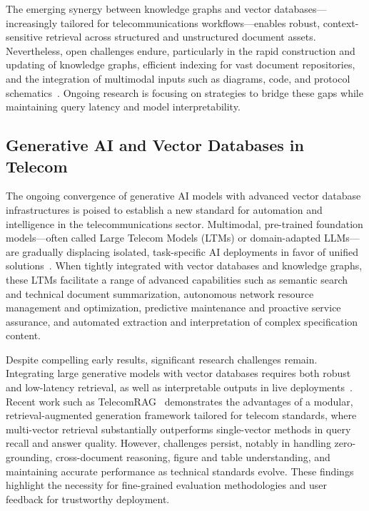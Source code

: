 \documentclass[sigconf]{acmart}
\begin{document}
The emerging synergy between knowledge graphs and vector databases---increasingly tailored for telecommunications workflows---enables robust, context-sensitive retrieval across structured and unstructured document assets. Nevertheless, open challenges endure, particularly in the rapid construction and updating of knowledge graphs, efficient indexing for vast document repositories, and the integration of multimodal inputs such as diagrams, code, and protocol schematics~\cite{ref20,ref21,ref26}. Ongoing research is focusing on strategies to bridge these gaps while maintaining query latency and model interpretability.

\subsection{Generative AI and Vector Databases in Telecom}

The ongoing convergence of generative AI models with advanced vector database infrastructures is poised to establish a new standard for automation and intelligence in the telecommunications sector. Multimodal, pre-trained foundation models---often called Large Telecom Models (LTMs) or domain-adapted LLMs---are gradually displacing isolated, task-specific AI deployments in favor of unified solutions~\cite{ref51,ref511}. When tightly integrated with vector databases and knowledge graphs, these LTMs facilitate a range of advanced capabilities such as semantic search and technical document summarization, autonomous network resource management and optimization, predictive maintenance and proactive service assurance, and automated extraction and interpretation of complex specification content.

Despite compelling early results, significant research challenges remain. Integrating large generative models with vector databases requires both robust and low-latency retrieval, as well as interpretable outputs in live deployments~\cite{ref20,ref21}. Recent work such as TelecomRAG~\cite{ref20} demonstrates the advantages of a modular, retrieval-augmented generation framework tailored for telecom standards, where multi-vector retrieval substantially outperforms single-vector methods in query recall and answer quality. However, challenges persist, notably in handling zero-grounding, cross-document reasoning, figure and table understanding, and maintaining accurate performance as technical standards evolve. These findings highlight the necessity for fine-grained evaluation methodologies and user feedback for trustworthy deployment.
\end{document}
